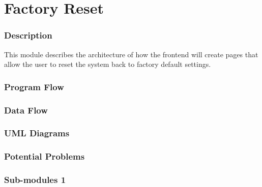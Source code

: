 
\section{Factory Reset}

\subsubsection{Description}

This module describes the architecture of how the frontend will create pages that allow the user to reset the system back to factory default settings.

\subsubsection{Program Flow}


\subsubsection{Data Flow}


\subsubsection{UML Diagrams}


\subsubsection{Potential Problems}


\subsubsection{Sub-modules 1}

